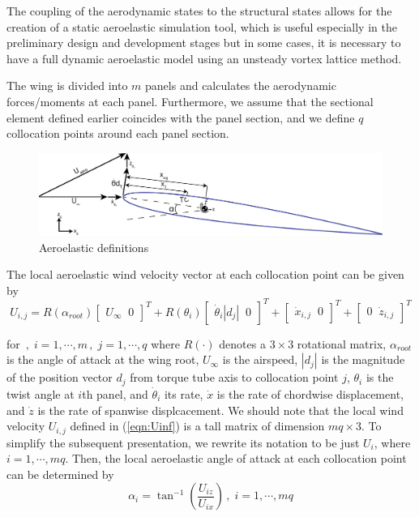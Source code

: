 \documentclass[11pt]{ucthesis}
\begin{document}
The coupling of the aerodynamic states to the structural states allows for the creation of a static aeroelastic simulation tool, which is useful especially in the preliminary design and development stages but in some cases, it is necessary to have a full dynamic aeroelastic model using an unsteady vortex lattice method. 

The wing is divided into $m$ panels and calculates the aerodynamic forces/moments at each panel. Furthermore, we assume that the sectional element defined earlier coincides with the panel section, and we define $q$ collocation points around each panel section. 

\begin{figure}[thpb]
\centering
\includegraphics[width=1\linewidth]{Figures/FullAeroelasticDefinitions.png}
\caption{Aeroelastic definitions}
\label{fig:def}
\end{figure}

The local aeroelastic wind velocity vector at each collocation point can be given by
\begin{equation}
U_{i,j} = R(\alpha_{root})\begin{bmatrix}U_{\infty} \;\; 0\end{bmatrix}^T +  R(\theta_{i})\begin{bmatrix}\dot{\theta}_{i} |d_{j}| \;\; 0\end{bmatrix}^T + \begin{bmatrix}\dot{x}_{i,j}\;\; 0\end{bmatrix}^T + \begin{bmatrix}0\;\; \dot{z}_{i,j}\end{bmatrix}^T
\label{eqn:Uinf}
\end{equation}

for $ \,,\;i=1,\cdots, m\,,\;j=1,\cdots, q$ where $R(\cdot)$ denotes a $3\times 3$ rotational matrix, $\alpha_{root}$ is the angle of attack at the wing root, $U_{\infty}$ is the airspeed, $|d_{j}|$ is the magnitude of the position vector $d_{j}$ from torque tube axis to collocation point $j$, $\theta_i$ is the twist angle at $i$th panel, and $\dot{\theta}_i$ its rate, $\dot{x}$ is the rate of chordwise displacement, and $\dot{z}$ is the rate of spanwise displcacement. We should note that the local wind velocity $U_{i,j}$ defined in (\ref{eqn:Uinf}) is a tall matrix of dimension $mq \times 3$. To simplify the subsequent presentation, we rewrite its notation to be just $U_i$, where $i=1,\cdots,mq$. Then, the local aeroelastic angle of attack at each collocation point can be determined by
\begin{equation}
\alpha_{i} = \tan^{-1} \left (\frac{U_{iz}}{U_{ix}} \right) \,,\;i=1,\cdots, mq
\label{eqn:alpha_aero}
\end{equation}
\end{document}
